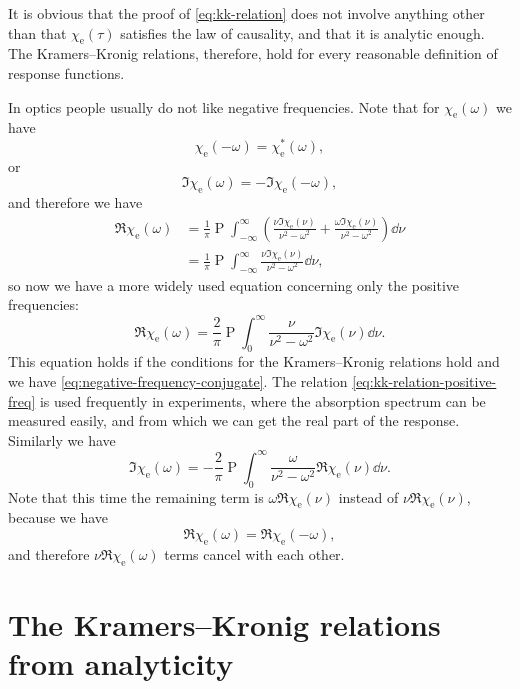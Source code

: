 \documentclass[hyperref, a4paper]{article}
\DeclareMathOperator{\primevalue}{P}
\begin{document}
It is obvious that the proof of \eqref{eq:kk-relation} does not involve anything other than that $\chi_\text{e}(\tau)$ satisfies the law of causality, and that it is analytic enough.
The Kramers–Kronig relations, therefore, hold for every reasonable definition of response functions.

In optics people usually do not like negative frequencies. Note that for $\chi_\text{e}(\omega)$ we have 
\begin{equation}
    \chi_\text{e}(-\omega) = \chi_\text{e}^*(\omega),
    \label{eq:negative-frequency-conjugate}
\end{equation}
or 
\[
    \Im \chi_\text{e}(\omega) = - \Im \chi_\text{e}(- \omega),
\]
and therefore we have 
\[
    \begin{aligned}
        \Re \chi_\text{e}(\omega) &= \frac{1}{\pi} \primevalue \int_{-\infty}^\infty \left( \frac{ \nu \Im \chi_\text{e}(\nu)}{\nu^2 - \omega^2} + \frac{ \omega \Im \chi_\text{e}(\nu)}{\nu^2 - \omega^2} \right) \dd{\nu} \\
        &= \frac{1}{\pi} \primevalue \int_{-\infty}^\infty \frac{ \nu \Im \chi_\text{e}(\nu)}{\nu^2 - \omega^2} \dd{\nu} ,
    \end{aligned}
\]
so now we have a more widely used equation concerning only the positive frequencies: 
\begin{equation}
    \Re \chi_\text{e}(\omega) = \frac{2}{\pi} \primevalue \int_0^\infty \frac{\nu}{\nu^2 - \omega^2} \Im \chi_\text{e}(\nu) \dd{\nu}.
    \label{eq:kk-relation-positive-freq}
\end{equation}
This equation holds if the conditions for the Kramers–Kronig relations hold and we have \eqref{eq:negative-frequency-conjugate}.
The relation \eqref{eq:kk-relation-positive-freq} is used frequently in experiments, where the absorption spectrum can be measured easily, and from which we can get the real part of the response.
Similarly we have 
\begin{equation}
    \Im \chi_\text{e}(\omega) = - \frac{2}{\pi} \primevalue \int_0^\infty \frac{\omega}{\nu^2 - \omega^2} \Re \chi_\text{e}(\nu) \dd{\nu}.
    \label{eq:kk-relation-positive-freq-im}
\end{equation}
Note that this time the remaining term is $\omega \Re \chi_\text{e}(\nu)$ instead of $\nu \Re \chi_\text{e}(\nu)$, because we have 
\[
    \Re \chi_\text{e}(\omega) = \Re \chi_\text{e}(-\omega),
\]
and therefore $\nu \Re \chi_\text{e}(\omega)$ terms cancel with each other.

\section{The Kramers–Kronig relations from analyticity}
\end{document}
